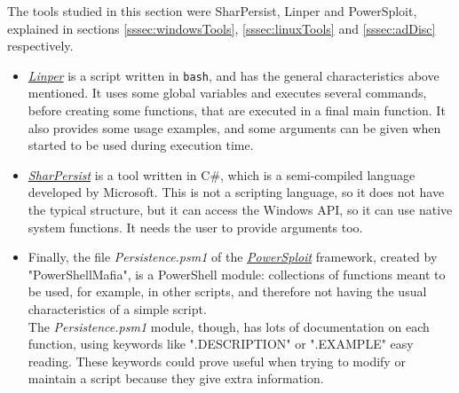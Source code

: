The tools studied in this section were SharPersist\cite{SharPersist}, Linper\cite{Linper} and PowerSploit\cite{PowerView}, explained in sections \ref{sssec:windowsTools}, \ref{sssec:linuxTools} and \ref{sssec:adDisc} respectively. 

\begin{itemize}
\item \href{https://github.com/montysecurity/linper/blob/main/linper.sh}{\textit{Linper}} is a script written in \texttt{bash}, and has the general characteristics above mentioned. It uses some global variables and executes several commands, before creating some functions, that are executed in a final main function. It also provides some usage examples, and some arguments can be given when started to be used during execution time.

\item \href{https://github.com/mandiant/SharPersist/blob/master/SharPersist/SharPersist.cs}{\textit{SharPersist}} is a tool written in C\#, which is a semi-compiled language 
developed by Microsoft. This is not a scripting language, so it does not have the typical structure, but it can access the Windows API, so it can use native system functions.
It needs the user to provide arguments too.

\item Finally, the file \textit{Persistence.psm1} of the \href{https://github.com/EmpireProject/Empire/blob/master/data/module_source/persistence/Persistence.psm1}{\textit{PowerSploit}} framework, created by "PowerShellMafia", is a PowerShell module:
collections of functions meant to be used, for example, in other scripts, and therefore not having the usual characteristics of a simple script.\\
The \textit{Persistence.psm1} module, though, has lots of documentation on each function, using keywords like ".DESCRIPTION" or ".EXAMPLE" easy reading. These keywords could prove useful when trying to modify or maintain a script because they give extra information.
\end{itemize}

